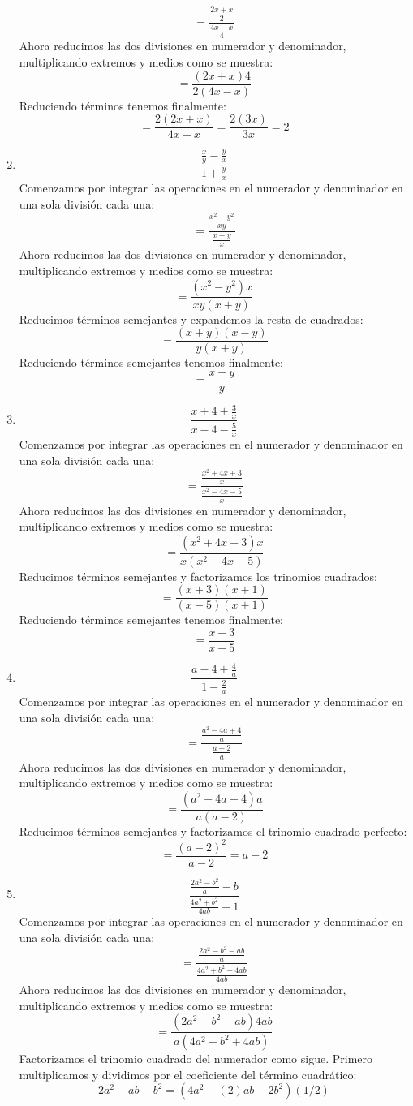 \documentclass[12pt]{article}
\begin{document}
\begin{enumerate}[label=\bfseries Ejercicio \arabic*:]
$$= \frac{\frac{2x + x}{2}}{\frac{4x - x}{4}}$$
Ahora reducimos las dos divisiones en numerador y denominador, multiplicando extremos y medios como se muestra:
$$= \frac{(2x + x)4}{2(4x - x)}$$
Reduciendo términos tenemos finalmente:
$$= \frac{2(2x + x)}{4x - x} = \frac{2(3x)}{3x} = 2$$
  \item $$\frac{\frac{x}{y} - \frac{y}{x}}{1 + \frac{y}{x}}$$
Comenzamos por integrar las operaciones en el numerador y denominador en una sola división cada una:
$$= \frac{\frac{x^2 - y^2}{xy}}{\frac{x + y}{x}}$$
Ahora reducimos las dos divisiones en numerador y denominador, multiplicando extremos y medios como se muestra:
$$= \frac{(x^2 - y^2)x}{xy(x + y)}$$
Reducimos términos semejantes y expandemos la resta de cuadrados:
$$= \frac{(x + y)(x - y)}{y(x + y)}$$
Reduciendo términos semejantes tenemos finalmente:
$$= \frac{x - y}{y}$$
  \item $$\frac{x + 4 +\frac{3}{x}}{x - 4 - \frac{5}{x}}$$
Comenzamos por integrar las operaciones en el numerador y denominador en una sola división cada una:
$$= \frac{\frac{x^2 + 4x +3}{x}}{\frac{x^2 - 4x - 5}{x}}$$
Ahora reducimos las dos divisiones en numerador y denominador, multiplicando extremos y medios como se muestra:
$$= \frac{(x^2 + 4x +3)x}{x(x^2 - 4x - 5)}$$
Reducimos términos semejantes y factorizamos los trinomios cuadrados:
$$= \frac{(x + 3)(x + 1)}{(x - 5)(x +1)}$$
Reduciendo términos semejantes tenemos finalmente:
$$= \frac{x + 3}{x - 5}$$
  \item $$\frac{a - 4 + \frac{4}{a}}{1 - \frac{2}{a}}$$
Comenzamos por integrar las operaciones en el numerador y denominador en una sola división cada una:
$$= \frac{\frac{a^2 - 4a + 4}{a}}{\frac{a - 2}{a}}$$
Ahora reducimos las dos divisiones en numerador y denominador, multiplicando extremos y medios como se muestra:
$$= \frac{(a^2 - 4a + 4)a}{a(a - 2)}$$
Reducimos términos semejantes y factorizamos el trinomio cuadrado perfecto:
$$= \frac{(a - 2)^2}{a - 2} = a - 2$$
  \item $$\frac{\frac{2a^2 - b ^2}{a} - b}{\frac{4a^2 + b^2}{4ab} + 1}$$
Comenzamos por integrar las operaciones en el numerador y denominador en una sola división cada una:
$$= \frac{\frac{2a^2 - b^2 - ab}{a}}{\frac{4a^2 + b^2 + 4ab}{4ab}}$$
Ahora reducimos las dos divisiones en numerador y denominador, multiplicando extremos y medios como se muestra:
$$= \frac{(2a^2 - b^2 - ab)4ab}{a(4a^2 + b^2 + 4ab)}$$
Factorizamos el trinomio cuadrado del numerador como sigue. Primero multiplicamos y dividimos por el coeficiente del término cuadrático:
$$2a^2 - ab - b^2 = (4a^2 -(2)ab - 2b^2)(1/2)$$

\end{enumerate}
\end{document}
